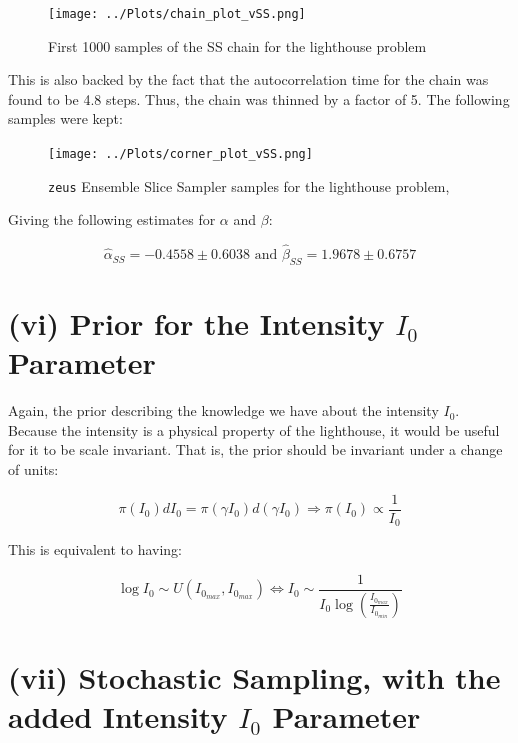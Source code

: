 \documentclass[12pt]{report} %
\begin{document}
\begin{figure}[h]
    \centering
    \texttt{[image: ../Plots/chain\_plot\_vSS.png]}
    \caption{First 1000 samples of the SS chain for the lighthouse problem}
    \label{fig:SS_convergence}
    \end{figure}

This is also backed by the fact that the autocorrelation time for the chain was found to be 4.8 steps. Thus, the chain was thinned by a factor of 5. The following samples were kept:

\newpage

\begin{figure}[h]
\centering
\texttt{[image: ../Plots/corner\_plot\_vSS.png]}
\caption{\texttt{zeus} Ensemble Slice Sampler samples for the lighthouse problem, }
\label{fig:SS_samples}
\end{figure}


Giving the following estimates for $\alpha$ and $\beta$:

\begin{equation}
    \hat{\alpha}_{SS} = -0.4558 \pm 0.6038 \text{ and } \hat{\beta}_{SS} = 1.9678 \pm 0.6757
\end{equation}

\section*{(vi) Prior for the Intensity $I_{0}$ Parameter}

Again, the prior describing the knowledge we have about the intensity $I_{0}$. Because the intensity is a physical property of the lighthouse, it would be useful for it to be scale invariant. That is, the prior should be invariant under a change of units:

\begin{equation}
    \pi(I_{0}) dI_{0} = \pi(\gamma I_{0}) d(\gamma I_{0}) \Rightarrow \pi(I_{0}) \propto \frac{1}{I_{0}}
\end{equation}

This is equivalent to having:

\begin{equation}
    \log I_{0} \sim U(I_{0_{max}}, I_{0_{max}})  \iff I_{0} \sim \frac{1}{I_{0} \log(\frac{I_{0_{max}}}{I_{0_{min}}})}
\end{equation}


\section*{(vii) Stochastic Sampling, with the added Intensity $I_{0}$ Parameter}
\end{document}
